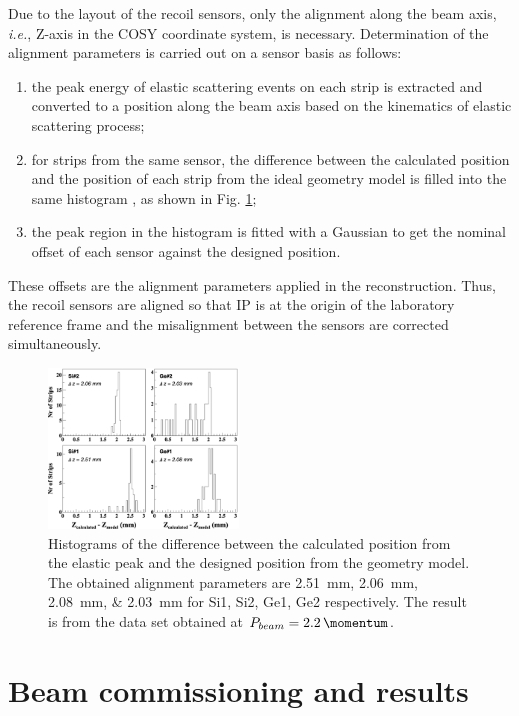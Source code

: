 \documentclass[number,5p]{elsarticle}
\begin{document}
Due to the layout of the recoil sensors, only the alignment along
the beam axis, \textit{i.e.}, Z-axis in the COSY coordinate system, is necessary.
Determination of the alignment parameters is carried out on a sensor basis as follows:
\begin{enumerate}
\item the peak energy of elastic scattering events on each strip is extracted and
  converted to a position along the beam axis based on the kinematics of elastic scattering process;
\item for strips from the same sensor, the difference between the calculated
  position and the position of each strip from the ideal geometry model is filled into the same histogram , as shown in Fig. \ref{fig:alignment};
\item the peak region in the histogram is fitted with a Gaussian to get the
  nominal offset of each sensor against the designed position.
\end{enumerate}
These offsets are the alignment parameters applied in the reconstruction.
Thus, the recoil sensors are aligned so that IP is at the origin of the
laboratory reference frame and the misalignment between the sensors are corrected simultaneously.
\begin{figure}[h!]
  \centering
  \includegraphics[width=0.45\textwidth]{./alignment.png}
  \caption{Histograms of the difference between the calculated position from the
    elastic peak and the designed position from the geometry model.
    The obtained alignment parameters are
    \SIlist[list-units=single]{2.51;2.06;2.08;2.03}{\mm} for Si1, Si2, Ge1, Ge2 respectively.
    The result is from the data set obtained at $P_{beam} =
    \SI{2.2}{\momentum}$.}
  \label{fig:alignment}
\end{figure}

\section{Beam commissioning and results}
\label{sec:result}
\end{document}
